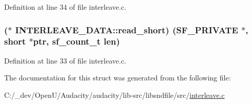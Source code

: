 Definition at line 34 of file interleave.\+c.

\subsubsection[{\texorpdfstring{read\+\_\+short}{read_short}}]{($\ast$ I\+N\+T\+E\+R\+L\+E\+A\+V\+E\+\_\+\+D\+A\+T\+A\+::read\+\_\+short) ({\bf S\+F\+\_\+\+P\+R\+I\+V\+A\+TE} $\ast$, short $\ast$ptr, {\bf sf\+\_\+count\+\_\+t} {\bf len})}\hypertarget{struct_i_n_t_e_r_l_e_a_v_e___d_a_t_a_ac494fcdef30c3abff24341ef4abaea9f}{}\label{struct_i_n_t_e_r_l_e_a_v_e___d_a_t_a_ac494fcdef30c3abff24341ef4abaea9f}


Definition at line 33 of file interleave.\+c.



The documentation for this struct was generated from the following file\+:\begin{DoxyCompactItemize}
\item 
C\+:/\+\_\+dev/\+Open\+U/\+Audacity/audacity/lib-\/src/libsndfile/src/\hyperlink{interleave_8c}{interleave.\+c}\end{DoxyCompactItemize}

